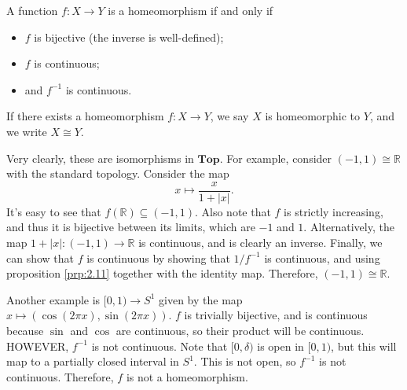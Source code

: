 \begin{definition}[Homeomorphism]\label{dfn:2.12}
	A function $f : X \to Y$ is a homeomorphism if and only if
	\begin{itemize}
		\item $f$ is bijective (the inverse is well-defined);
		\item $f$ is continuous;
		\item and $f^{-1} $ is continuous.
	\end{itemize}
	If there exists a homeomorphism $f : X \to Y$, we say $X$ is homeomorphic to $Y$, and we write $X \cong Y$.
\end{definition}

Very clearly, these are isomorphisms in $\mathbf{Top} $. For example, consider $(-1,1)\cong \mathbb{R} $ with the standard topology. Consider the map
\[
	x\mapsto \frac{x}{1+\left| x \right| } 
.\]
It's easy to see that $f(\mathbb{R} )\subseteq (-1,1)$. Also note that $f$ is strictly increasing, and thus it is bijective between its limits, which are $-1$ and $1$. Alternatively, the map $1+\left| x \right| : (-1,1) \to \mathbb{R} $ is continuous, and is clearly an inverse. Finally, we can show that $f$ is continuous by showing that $1/f^{-1} $ is continuous, and using proposition \ref{prp:2.11} together with the identity map. Therefore, $(-1,1)\cong \mathbb{R} $.

Another example is $[0,1)\to S^1$ given by the map $x\mapsto (\cos (2\pi x),\sin (2\pi x))$. $f$ is trivially bijective, and is continuous because $\sin $ and $\cos $ are continuous, so their product will be continuous. HOWEVER, $f^{-1} $ is not continuous. Note that $[0,\delta )$ is open in $[0,1)$, but this will map to a partially closed interval in $S^1$. This is not open, so $f^{-1} $ is not continuous. Therefore, $f$ is not a homeomorphism.
